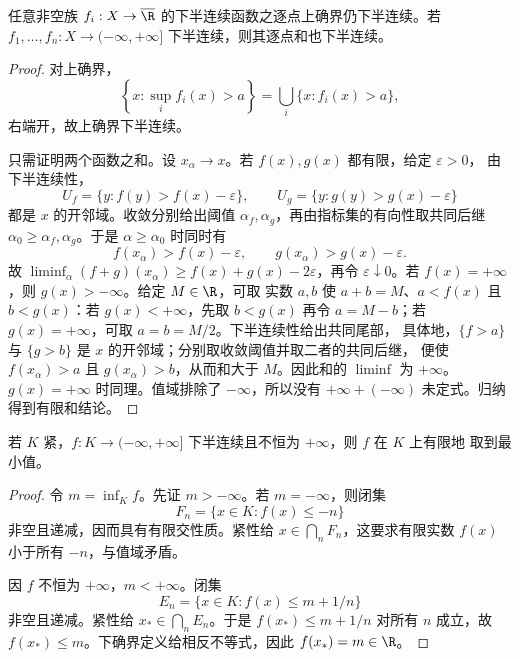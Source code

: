 \begin{proposition}[上确界与有限和的稳定性]\label{proposition:1-2-3-2}
任意非空族 \(f_i:X\to\overline\R\) 的下半连续函数之逐点上确界仍下半连续。若
\(f_1,\ldots,f_n:X\to(-\infty,+\infty]\) 下半连续，则其逐点和也下半连续。
\end{proposition}
\begin{proof}
对上确界，
\[
 \left\{x:\sup_i f_i(x)>a\right\}
 =\bigcup_i\{x:f_i(x)>a\},
\]
右端开，故上确界下半连续。

只需证明两个函数之和。设 \(x_\alpha\to x\)。若 \(f(x),g(x)\) 都有限，给定 \(\varepsilon>0\)，
由下半连续性，
\[
 U_f=\{y:f(y)>f(x)-\varepsilon\},\qquad
 U_g=\{y:g(y)>g(x)-\varepsilon\}
\]
都是 \(x\) 的开邻域。收敛分别给出阈值 \(\alpha_f,\alpha_g\)，再由指标集的有向性取共同后继
\(\alpha_0\ge\alpha_f,\alpha_g\)。于是 \(\alpha\ge\alpha_0\) 时同时有
\[
 f(x_\alpha)>f(x)-\varepsilon,\qquad
 g(x_\alpha)>g(x)-\varepsilon.
\]
故 \(\liminf_\alpha(f+g)(x_\alpha)\ge f(x)+g(x)-2\varepsilon\)，再令
\(\varepsilon\downarrow0\)。若 \(f(x)=+\infty\)，则 \(g(x)>-\infty\)。给定 \(M\in\R\)，可取
实数 \(a,b\) 使 \(a+b=M\)、\(a<f(x)\) 且 \(b<g(x)\)：若 \(g(x)<+\infty\)，先取
\(b<g(x)\) 再令 \(a=M-b\)；若 \(g(x)=+\infty\)，可取 \(a=b=M/2\)。下半连续性给出共同尾部，
具体地，\(\{f>a\}\) 与 \(\{g>b\}\) 是 \(x\) 的开邻域；分别取收敛阈值并取二者的共同后继，
便使 \(f(x_\alpha)>a\) 且 \(g(x_\alpha)>b\)，从而和大于 \(M\)。因此和的 \(\liminf\) 为
\(+\infty\)。\(g(x)=+\infty\) 时同理。值域排除了 \(-\infty\)，所以没有
\(+\infty+(-\infty)\) 未定式。归纳得到有限和结论。
\end{proof}

\begin{theorem}[紧集上的极值]\label{theorem:1-2-3-3}
若 \(K\) 紧，\(f:K\to(-\infty,+\infty]\) 下半连续且不恒为 \(+\infty\)，则 \(f\) 在 \(K\) 上有限地
取到最小值。
\end{theorem}
\begin{proof}
令 \(m=\inf_Kf\)。先证 \(m>-\infty\)。若 \(m=-\infty\)，则闭集
\[
 F_n=\{x\in K:f(x)\le-n\}
\]
非空且递减，因而具有有限交性质。紧性给 \(x\in\bigcap_nF_n\)，这要求有限实数 \(f(x)\) 小于所有
\(-n\)，与值域矛盾。

因 \(f\) 不恒为 \(+\infty\)，\(m<+\infty\)。闭集
\[
 E_n=\{x\in K:f(x)\le m+1/n\}
\]
非空且递减。紧性给 \(x_*\in\bigcap_nE_n\)。于是 \(f(x_*)\le m+1/n\) 对所有 \(n\) 成立，故
\(f(x_*)\le m\)。下确界定义给相反不等式，因此 \(f(x_*)=m\in\R\)。
\end{proof}

